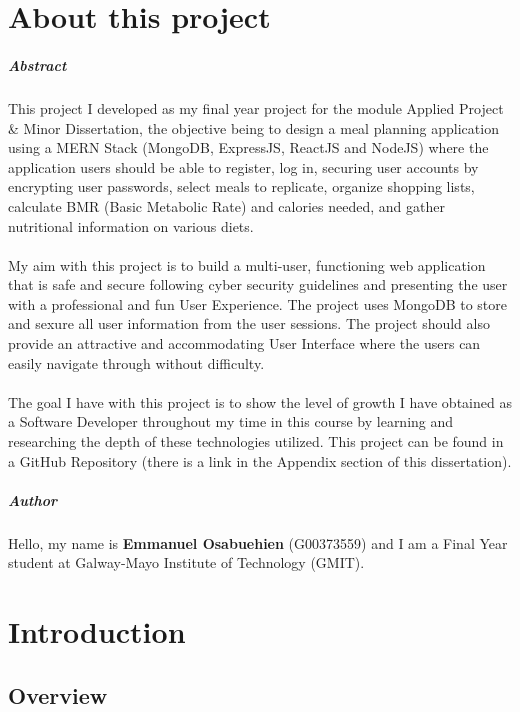 
\chapter*{About this project}
\paragraph{Abstract}
This project I developed as my final year project for the module Applied Project \& Minor Dissertation, the objective being to design a meal planning application using a MERN Stack (MongoDB, ExpressJS, ReactJS and NodeJS) where the application users should be able to register, log in, securing user accounts by encrypting user passwords, select meals to replicate, organize shopping lists, calculate BMR (Basic Metabolic Rate) and calories needed, and gather nutritional information on various diets.\\ \\
My aim with this project is to build a multi-user, functioning web application that is safe and secure following cyber security guidelines and presenting the user with a professional and fun User Experience. The project uses MongoDB to store and sexure all user information from the user sessions. The project should also provide an attractive and accommodating User Interface where the users can easily navigate through without difficulty.\\ \\
The goal I have with this project is to show the level of growth I have obtained as a Software Developer throughout my time in this course by learning and researching the depth of these technologies utilized. This project can be found in a GitHub Repository (there is a link in the Appendix section of this dissertation).

\paragraph{Author}
Hello, my name is \textbf{Emmanuel Osabuehien} (G00373559) and I am a Final Year student at Galway-Mayo Institute of Technology (GMIT).

\chapter{Introduction}

\section{Overview}

